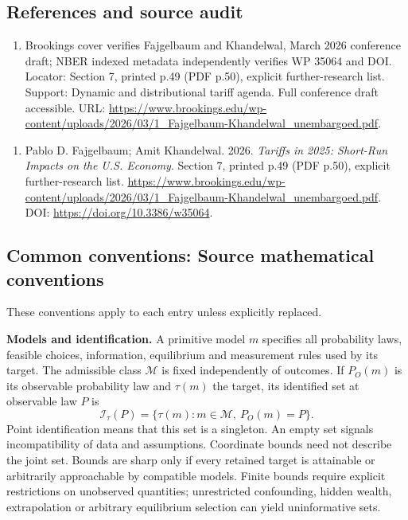 \documentclass[11pt,a4paper]{article}
\begin{document}
\subsection*{References and source audit}
\begin{enumerate}
\item Brookings cover verifies Fajgelbaum and Khandelwal, March 2026 conference draft; NBER indexed metadata independently verifies WP 35064 and DOI. Locator: Section 7, printed p.49 (PDF p.50), explicit further-research list. Support: Dynamic and distributional tariff agenda. Full conference draft accessible. URL: \url{https://www.brookings.edu/wp-content/uploads/2026/03/1_Fajgelbaum-Khandelwal_unembargoed.pdf}.
\end{enumerate}
\begin{enumerate}\raggedright
\item\hypertarget{definitions:source:30007624:1}{} Pablo D. Fajgelbaum; Amit Khandelwal. 2026. \emph{Tariffs in 2025: Short-Run Impacts on the U.S. Economy}. Section 7, printed p.49 (PDF p.50), explicit further-research list.
\url{https://www.brookings.edu/wp-content/uploads/2026/03/1_Fajgelbaum-Khandelwal_unembargoed.pdf}.
DOI: \url{https://doi.org/10.3386/w35064}.
\end{enumerate}

\subsection*{Common conventions: Source mathematical conventions}

These conventions apply to each entry unless explicitly replaced.

\textbf{Models and identification.} A primitive model \(m\) specifies all probability laws, feasible choices, information, equilibrium and measurement rules used by its target. The admissible class \(\mathcal M\) is fixed independently of outcomes. If \(P_O(m)\) is its observable probability law and \(\tau(m)\) the target, its identified set at observable law \(P\) is
\[
 \mathcal I_\tau(P)=\{\tau(m):m\in\mathcal M,\ P_O(m)=P\}.
\]
Point identification means that this set is a singleton. An empty set signals incompatibility of data and assumptions. Coordinate bounds need not describe the joint set. Bounds are sharp only if every retained target is attainable or arbitrarily approachable by compatible models. Finite bounds require explicit restrictions on unobserved quantities; unrestricted confounding, hidden wealth, extrapolation or arbitrary equilibrium selection can yield uninformative sets.
\end{document}
